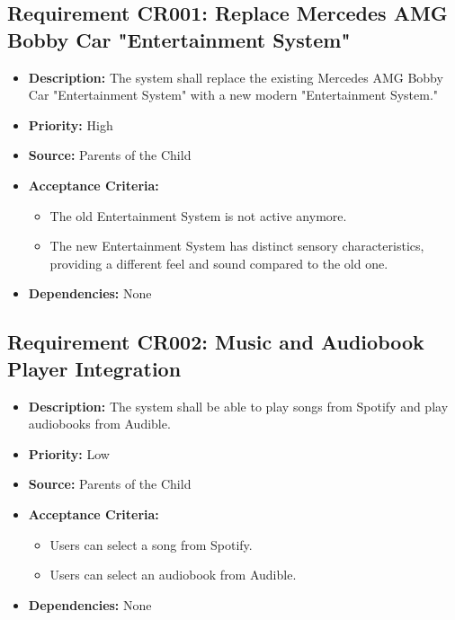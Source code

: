 \documentclass{article}
\begin{document}
	\subsection{Requirement CR001: Replace Mercedes AMG Bobby Car "Entertainment System"}
	\begin{itemize}
		\item \textbf{Description:} The system shall replace the existing Mercedes AMG Bobby Car "Entertainment System" with a new modern "Entertainment System."
		\item \textbf{Priority:} High
		\item \textbf{Source:} Parents of the Child
		\item \textbf{Acceptance Criteria:}
		\begin{itemize}
			\item The old Entertainment System is not active anymore.
			\item The new Entertainment System has distinct sensory characteristics, providing a different feel and sound compared to the old one.
		\end{itemize}
		\item \textbf{Dependencies:} None
	\end{itemize}
	
	\subsection{Requirement CR002: Music and Audiobook Player Integration}
	\begin{itemize}
		\item \textbf{Description:} The system shall be able to play songs from Spotify and play audiobooks from Audible.
		\item \textbf{Priority:} Low
		\item \textbf{Source:} Parents of the Child
		\item \textbf{Acceptance Criteria:}
		\begin{itemize}
			\item Users can select a song from Spotify.
			\item Users can select an audiobook from Audible.
		\end{itemize}
		\item \textbf{Dependencies:} None
	\end{itemize}
	
\end{document}

